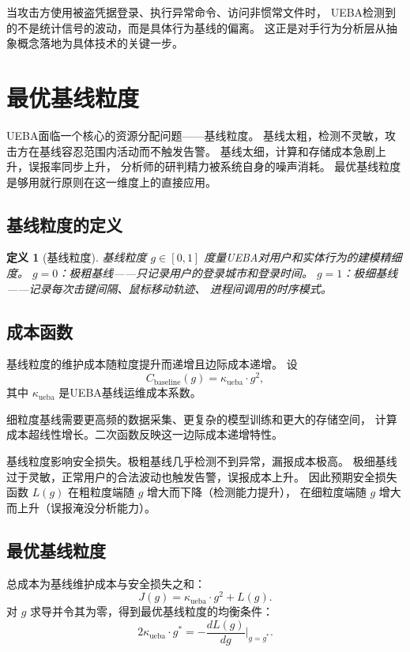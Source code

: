 \documentclass[11pt,a4paper]{article}
\newtheorem{definition}{定义}[section]
\begin{document}
当攻击方使用被盗凭据登录、执行异常命令、访问非惯常文件时，
UEBA检测到的不是统计信号的波动，而是具体行为基线的偏离。
这正是对手行为分析层从抽象概念落地为具体技术的关键一步。

\section{最优基线粒度}

UEBA面临一个核心的资源分配问题——基线粒度。
基线太粗，检测不灵敏，攻击方在基线容忍范围内活动而不触发告警。
基线太细，计算和存储成本急剧上升，误报率同步上升，
分析师的研判精力被系统自身的噪声消耗。
最优基线粒度是够用就行原则在这一维度上的直接应用。

\subsection{基线粒度的定义}

\begin{definition}[基线粒度]
基线粒度 \(g \in [0,1]\) 度量UEBA对用户和实体行为的建模精细度。
\(g = 0\)：极粗基线——只记录用户的登录城市和登录时间。
\(g = 1\)：极细基线——记录每次击键间隔、鼠标移动轨迹、
进程间调用的时序模式。
\end{definition}

\subsection{成本函数}

基线粒度的维护成本随粒度提升而递增且边际成本递增。
设
\[
C_{\text{baseline}}(g) = \kappa_{\text{ueba}} \cdot g^2,
\]
其中 \(\kappa_{\text{ueba}}\) 是UEBA基线运维成本系数。

细粒度基线需要更高频的数据采集、更复杂的模型训练和更大的存储空间，
计算成本超线性增长。二次函数反映这一边际成本递增特性。

基线粒度影响安全损失。极粗基线几乎检测不到异常，漏报成本极高。
极细基线过于灵敏，正常用户的合法波动也触发告警，误报成本上升。
因此预期安全损失函数 \(L(g)\) 在粗粒度端随 \(g\) 增大而下降（检测能力提升），
在细粒度端随 \(g\) 增大而上升（误报淹没分析能力）。

\subsection{最优基线粒度}

总成本为基线维护成本与安全损失之和：
\[
J(g) = \kappa_{\text{ueba}} \cdot g^2 + L(g).
\]
对 \(g\) 求导并令其为零，得到最优基线粒度的均衡条件：
\[
2\kappa_{\text{ueba}} \cdot g^* = -\frac{dL(g)}{dg}\bigg|_{g=g^*}.
\]
\end{document}
